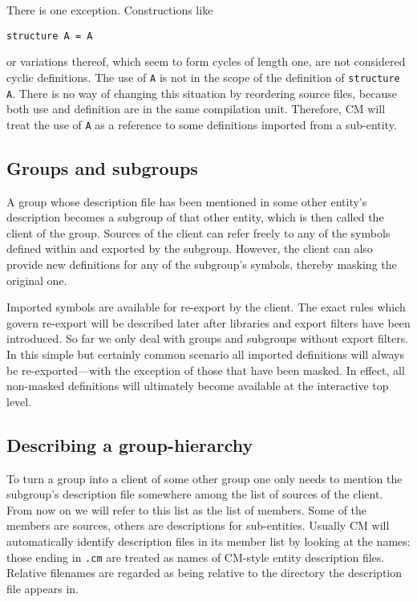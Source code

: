 \documentclass{article}
\begin{document}
There is one exception.  Constructions like
\begin{verbatim}
structure A = A
\end{verbatim}
or variations thereof, which seem to form cycles of length one, are
not considered cyclic definitions.  The use of {\tt A} is
not in the scope of the definition of {\tt structure A}.  There is no
way of changing this situation by reordering source files, because
both use and definition are in the same compilation unit.  Therefore,
CM will treat the use of {\tt A} as a reference to some
definitions imported from a sub-entity.

\subsection{Groups and subgroups}

A group whose description file has been mentioned in some other
entity's description becomes a subgroup of that other entity, which is
then called the client of the group.  Sources of the client can refer
freely to any of the symbols defined within and exported by the
subgroup.  However, the client can also provide new definitions for
any of the subgroup's symbols, thereby masking the original one.

Imported symbols are available for re-export by the client.  The exact
rules which govern re-export will be described later after libraries
and export filters have been introduced.  So far we only deal with
groups and subgroups without export filters.  In this simple but
certainly common scenario all imported definitions will always be
re-exported---with the exception of those that have been masked.  In
effect, all non-masked definitions will ultimately become available at
the interactive top level.

\subsection{Describing a group-hierarchy}

To turn a group into a client of some other group one only needs to
mention the subgroup's description file somewhere among the list of
sources of the client.  From now on we will refer to this list as the
list of members.  Some of the members are sources, others are
descriptions for sub-entities.  Usually CM will automatically identify
description files in its member list by looking at the names: those
ending in {\tt .cm} are treated as names of CM-style entity
description files.  Relative filenames are regarded as being relative
to the directory the description file appears in.
\end{document}
